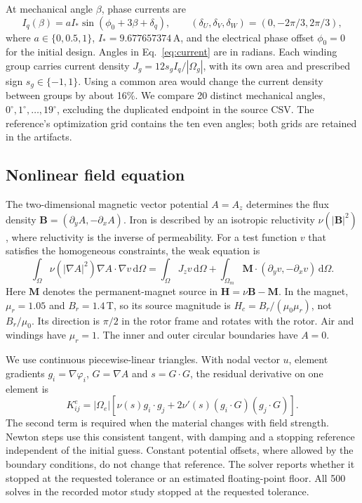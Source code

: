 \documentclass{anvil-paper}
\newcommand{\dd}{\,\mathrm{d}}
\begin{document}
At mechanical angle $\beta$, phase currents are
\begin{equation}
 I_q(\beta)=a I_*\sin(\phi_0+3\beta+\delta_q),\qquad
 (\delta_U,\delta_V,\delta_W)=(0,-2\pi/3,2\pi/3),
 \label{eq:current}
\end{equation}
where $a\in\{0,0.5,1\}$, $I_*=9.677657374$\,A, and the electrical phase
offset $\phi_0=0$ for the initial design. Angles in
Eq.~\eqref{eq:current} are in radians. Each winding group carries current
density $J_g=12s_g I_q/|\Omega_g|$, with its own area and prescribed sign
$s_g\in\{-1,1\}$. Using a common area would change the current density
between groups by about 16\%. We compare 20 distinct mechanical angles,
$0^\circ,1^\circ,\ldots,19^\circ$, excluding the duplicated endpoint in
the source CSV. The reference's optimization grid contains the ten even
angles; both grids are retained in the artifacts.

\subsection{Nonlinear field equation}
The two-dimensional magnetic vector potential $A=A_z$ determines the
flux density $\mathbf B=(\partial_y A,-\partial_x A)$. Iron is described
by an isotropic reluctivity $\nu(|\mathbf B|^2)$, where reluctivity is
the inverse of permeability. For a test function $v$ that satisfies the
homogeneous constraints, the weak equation is
\begin{equation}
 \int_\Omega \nu(|\nabla A|^2)\nabla A\cdot\nabla v\dd\Omega
 =\int_\Omega J_z v\dd\Omega
  +\int_{\Omega_m}\mathbf M\cdot(\partial_y v,-\partial_x v)\dd\Omega.
 \label{eq:weak}
\end{equation}
Here $\mathbf M$ denotes the permanent-magnet source in
$\mathbf H=\nu\mathbf B-\mathbf M$. In the magnet,
$\mu_r=1.05$ and $B_r=1.4$\,T, so its source magnitude is
$H_c=B_r/(\mu_0\mu_r)$, not $B_r/\mu_0$. Its direction is $\pi/2$
in the rotor frame and rotates with the rotor. Air and windings have
$\mu_r=1$. The inner and outer circular boundaries have $A=0$.

We use continuous piecewise-linear triangles. With nodal vector $u$,
element gradients $g_i=\nabla\varphi_i$, $G=\nabla A$ and $s=G\cdot G$,
the residual derivative on one element is
\begin{equation}
 K^e_{ij}=|\Omega_e|\left[\nu(s)g_i\cdot g_j
       +2\nu'(s)(g_i\cdot G)(g_j\cdot G)\right].
 \label{eq:tangent}
\end{equation}
The second term is required when the material changes with field strength.
Newton steps use this consistent tangent, with damping and a stopping
reference independent of the initial guess. Constant potential offsets,
where allowed by the boundary conditions, do not change that reference.
The solver reports whether it stopped at the requested tolerance or an
estimated floating-point floor. All 500 solves in the recorded motor study
stopped at the requested tolerance.
\end{document}

